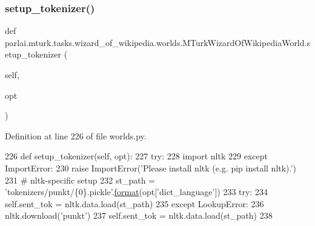 \subsubsection{\texorpdfstring{setup\+\_\+tokenizer()}{setup\_tokenizer()}}
{\footnotesize\ttfamily def parlai.\+mturk.\+tasks.\+wizard\+\_\+of\+\_\+wikipedia.\+worlds.\+M\+Turk\+Wizard\+Of\+Wikipedia\+World.\+setup\+\_\+tokenizer (\begin{DoxyParamCaption}\item[{}]{self,  }\item[{}]{opt }\end{DoxyParamCaption})}



Definition at line 226 of file worlds.\+py.


\begin{DoxyCode}
226     \textcolor{keyword}{def }setup\_tokenizer(self, opt):
227         \textcolor{keywordflow}{try}:
228             \textcolor{keyword}{import} nltk
229         \textcolor{keywordflow}{except} ImportError:
230             \textcolor{keywordflow}{raise} ImportError(\textcolor{stringliteral}{'Please install nltk (e.g. pip install nltk).'})
231         \textcolor{comment}{# nltk-specific setup}
232         st\_path = \textcolor{stringliteral}{'tokenizers/punkt/\{0\}.pickle'}.\hyperlink{namespaceparlai_1_1chat__service_1_1services_1_1messenger_1_1shared__utils_a32e2e2022b824fbaf80c747160b52a76}{format}(opt[\textcolor{stringliteral}{'dict\_language'}])
233         \textcolor{keywordflow}{try}:
234             self.sent\_tok = nltk.data.load(st\_path)
235         \textcolor{keywordflow}{except} LookupError:
236             nltk.download(\textcolor{stringliteral}{'punkt'})
237             self.sent\_tok = nltk.data.load(st\_path)
238 
\end{DoxyCode}
\mbox{\label{classparlai_1_1mturk_1_1tasks_1_1wizard__of__wikipedia_1_1worlds_1_1MTurkWizardOfWikipediaWorld_ae83f8e16372c0d18ceda5a2de734d146}} 
